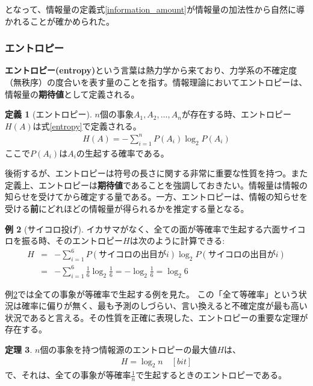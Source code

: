 \documentclass[uplatex,dvipdfmx,b5j,10pt]{jsbook}
\theoremstyle{definition}
\newtheorem{theorem}{定理}
\newtheorem{definition}[theorem]{定義}
\newtheorem{example}[theorem]{例}
\begin{document}
となって、情報量の定義式\ref{information_amount}が情報量の加法性から自然に導かれることが確かめられた。

\subsubsection{エントロピー}

\textbf{エントロピー(entropy)}という言葉は熱力学から来ており、力学系の不確定度（無秩序）の度合いを表す量のことを指す。情報理論においてエントロピーは、情報量の\textbf{期待値}として定義される。

\begin{definition}[エントロピー]
  $n$個の事象$A_{1}, A_{2}, \dots, A_{n}$が存在する時、エントロピー$H(A)$は式\ref{entropy}で定義される。
  \begin{eqnarray}
    H(A) = -\sum_{i = 1}^{n} P(A_{i}) \log_{2} P(A_{i}) \label{entropy}
  \end{eqnarray}
  ここで$P(A_{i})$は$A_{i}$の生起する確率である。
\end{definition}

後術するが、エントロピーは符号の長さに関する非常に重要な性質を持つ。また定義上、エントロピーは\textbf{期待値}であることを強調しておきたい。情報量は情報の知らせを受けてから確定する量である。一方、エントロピーは、情報の知らせを受ける\textbf{前}にどれほどの情報量が得られるかを推定する量となる。

\begin{example}[サイコロ投げ] \label{dice6_roll}
イカサマがなく、全ての面が等確率で生起する六面サイコロを振る時、そのエントロピー$H$は次のように計算できる:
\begin{eqnarray*}
  H &=& - \sum_{i = 1}^{6} P(サイコロの出目がi) \log_{2} P(サイコロの出目がi) \\
  &=& - \sum_{i = 1}^{6} \frac{1}{6} \log_{2} \frac{1}{6} = -\log_{2} \frac{1}{6} = \log_{2} 6 
\end{eqnarray*}
\end{example}

例\ref{dice6_roll}では全ての事象が等確率で生起する例を見た。
この「全て等確率」という状況は確率に偏りが無く、最も予測のしづらい、言い換えると不確定度が最も高い状況であると言える。その性質を正確に表現した、エントロピーの重要な定理が存在する。
\begin{theorem} \label{max_entropy}
  $n$個の事象を持つ情報源のエントロピーの最大値$H$は、
  \begin{eqnarray}
    H = \log_{2} n \quad [bit]
  \end{eqnarray}
  で、それは、全ての事象が等確率$\displaystyle\frac{1}{n}$で生起するときのエントロピーである。
\end{theorem}
\end{document}
